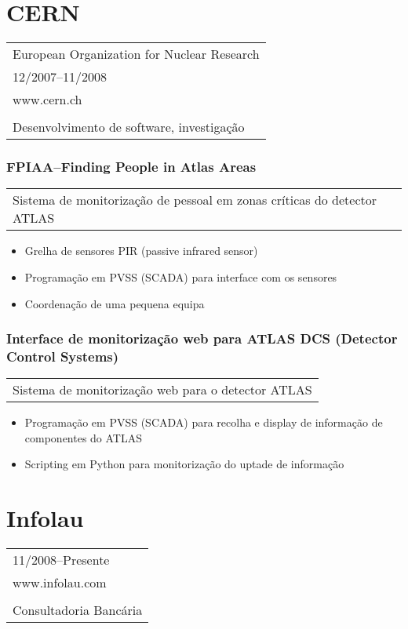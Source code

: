 \documentclass[a4paper,portuguese]{article}
\begin{document}
\section*{CERN}
    \begin{tabular}{l}
        European Organization for Nuclear Research \\
        12/2007--11/2008 \\
        www.cern.ch \\
        \\
        Desenvolvimento de software, investigação \\
    \end{tabular}
    \subsubsection*{FPIAA--Finding People in Atlas Areas}
    \begin{tabular}{l}
        Sistema de monitorização de pessoal em zonas críticas do detector ATLAS \\
    \end{tabular}
    \begin{itemize}
    \setlength{\itemsep}{-1mm}
        \item[] Grelha de sensores PIR (passive infrared sensor)
        \item[] Programação em PVSS (SCADA) para interface com os sensores
        \item[] Coordenação de uma pequena equipa
    \end{itemize}
    \subsubsection*{Interface de monitorização web para ATLAS DCS (Detector Control Systems)}
    \begin{tabular}{l}
        Sistema de monitorização web para o detector ATLAS
    \end{tabular}
    \begin{itemize}
    \setlength{\itemsep}{-1mm}
        \item[] Programação em PVSS (SCADA) para recolha e display de informação de componentes do ATLAS
        \item[] Scripting em Python para monitorização do uptade de informação
    \end{itemize}
    \vspace{0.5cm}
\section*{Infolau}
    \begin{tabular}{l}
        11/2008--Presente \\
        www.infolau.com \\
        \\
        Consultadoria Bancária
    \end{tabular}
\end{document}

